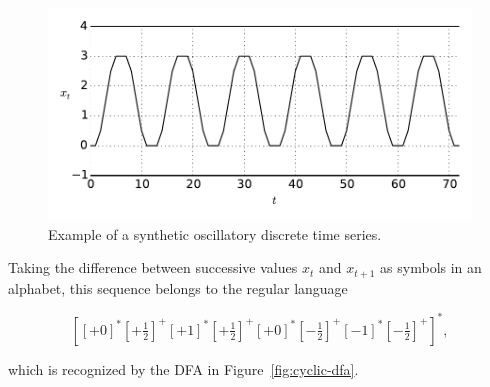 \documentclass[12pt]{report}
\newcommand{\1}[0]{\mathbbm{1}}
\begin{document}
\begin{figure}[H]
    \centering
    \includegraphics[width=1\textwidth]{img/osc-step.pdf}
    \caption[Oscillatory discrete time series]{
        Example of a synthetic oscillatory discrete time series.
    }
    \label{fig:osc-step}
\end{figure}

Taking the difference between successive values $x_t$ and $x_{t+1}$
as symbols in an alphabet, this sequence belongs to the regular language

\[
    \left[
        \left[+0\right]^*
        \left[+\tfrac{1}{2}\right]^+
        \left[+1\right]^*
        \left[+\tfrac{1}{2}\right]^+
        \left[+0\right]^*
        \left[-\tfrac{1}{2}\right]^+
        \left[-1\right]^*
        \left[-\tfrac{1}{2}\right]^+
    \right]^*,
\]

which is recognized by the \ac{DFA} in Figure~\ref{fig:cyclic-dfa}.
\end{document}
